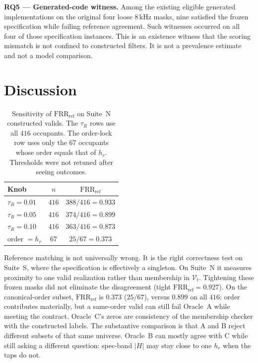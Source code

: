 \documentclass{article}
\begin{document}
\noindent\textbf{RQ5 --- Generated-code witness.}
Among the existing eligible generated implementations on the
original four loose $8\,\mathrm{kHz}$ masks, nine satisfied the
frozen specification while failing reference agreement.
Such witnesses occurred on all four of those specification
instances.
This is an existence witness that the scoring mismatch is not
confined to constructed filters.
It is not a prevalence estimate and not a model comparison.

\section{Discussion}
\label{sec:disc}

\begin{table}[t]
\caption{Sensitivity of $\mathrm{FRR}_{\mathrm{ref}}$ on Suite~N
constructed valids.
The $\tau_R$ rows use all $416$ occupants.
The order-lock row uses only the $67$ occupants whose order equals
that of $h_r$.
Thresholds were not retuned after seeing outcomes.}
\label{tab:ablate}
\centering
\footnotesize
\setlength{\tabcolsep}{4.5pt}
\begin{tabular}{@{}lcc@{}}
\hline
Knob & $n$ & $\mathrm{FRR}_{\mathrm{ref}}$ \\
\hline
$\tau_R=0.01$ & $416$ & $388/416=0.933$ \\
$\tau_R=0.05$ & $416$ & $374/416=0.899$ \\
$\tau_R=0.10$ & $416$ & $363/416=0.873$ \\
order $=h_r$ & $67$ & $25/67=0.373$ \\
\hline
\end{tabular}
\end{table}

Reference matching is not universally wrong.
It is the right correctness test on Suite~S, where the specification
is effectively a singleton.
On Suite~N it measures proximity to one valid realization rather than
membership in $\mathcal{V}_t$.
Tightening these frozen masks did not eliminate the disagreement
(tight $\mathrm{FRR}_{\mathrm{ref}}=0.927$).
On the canonical-order subset, $\mathrm{FRR}_{\mathrm{ref}}$ is
$0.373$ ($25/67$), versus $0.899$ on all $416$: order contributes
materially, but a same-order valid can still fail Oracle~A while
meeting the contract.
Oracle~C's zeros are consistency of the membership checker with the
constructed labels.
The substantive comparison is that A and B reject different subsets
of that same universe.
Oracle~B can mostly agree with C while still asking a different
question: spec-band $\lvert H\rvert$ may stay close to one $h_r$
when the taps do not.
\end{document}
